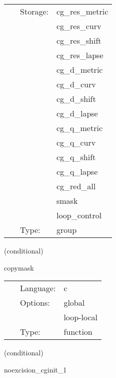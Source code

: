  \begin{tabular*}{160mm}{cll} 
~ & Storage:  & cg\_res\_metric \\ 
~& ~ &cg\_res\_curv\\ 
~& ~ &cg\_res\_shift\\ 
~& ~ &cg\_res\_lapse\\ 
~& ~ &cg\_d\_metric\\ 
~& ~ &cg\_d\_curv\\ 
~& ~ &cg\_d\_shift\\ 
~& ~ &cg\_d\_lapse\\ 
~& ~ &cg\_q\_metric\\ 
~& ~ &cg\_q\_curv\\ 
~& ~ &cg\_q\_shift\\ 
~& ~ &cg\_q\_lapse\\ 
~& ~ &cg\_red\_all\\ 
~& ~ &smask\\ 
~& ~ &loop\_control\\ 
~ & Type:  & group \\ 
\end{tabular*} 


\vspace{5mm}

   (conditional) 

\hspace{5mm} copymask 

\hspace{5mm}{\it copy the weight function from carpetreduce } 


\hspace{5mm}

 \begin{tabular*}{160mm}{cll} 
~ & Language:  & c \\ 
~ & Options:  & global \\ 
~& ~ &loop-local\\ 
~ & Type:  & function \\ 
\end{tabular*} 


\vspace{5mm}

   (conditional) 

\hspace{5mm} noexcision\_cginit\_1 

\hspace{5mm}{\it initialise the conjugate gradient method 1 } 


\hspace{5mm}

